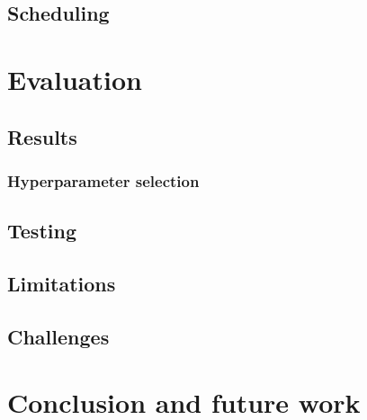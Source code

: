 \documentclass[a4paper,12pt,twoside,openright]{report}
\begin{document}
\section{Scheduling} 


\chapter{Evaluation}
 


\section{Results}

\subsection{Hyperparameter selection}


\section{Testing}
\section{Limitations}
\section{Challenges} %
\chapter{Conclusion and future work} 
\end{document}
